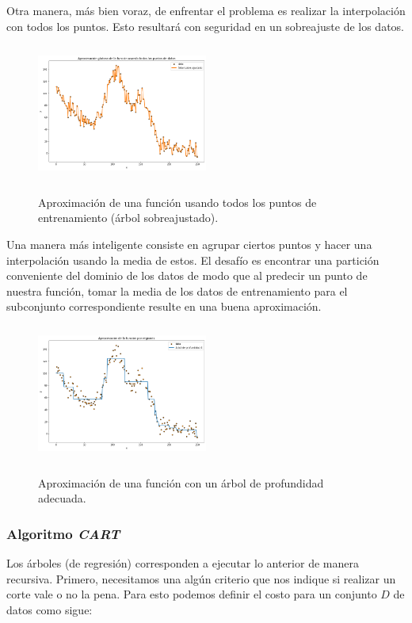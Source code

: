 Otra manera, más bien voraz, de enfrentar el problema es realizar la interpolación con todos los puntos. Esto resultará con seguridad en un sobreajuste de los datos.

\begin{figure}[h]
	\centering
	\includegraphics[width=0.5\textwidth, height=4.5cm]{img/capN_sobreajuste_arbol.png}\\
	\caption{Aproximación de una función usando todos los puntos de entrenamiento (árbol sobreajustado).}
\end{figure}

Una manera más inteligente consiste en agrupar ciertos puntos y hacer una interpolación usando la media de estos. El desafío es encontrar una partición conveniente del dominio de los datos de modo que al predecir un punto de nuestra función, tomar la media de los datos de entrenamiento para el subconjunto correspondiente resulte en una buena aproximación.

\begin{figure}[h]
	\centering
	\includegraphics[width=0.5\textwidth, height=4.5cm]{img/capN_buen_arbol.png}\\
	\caption{Aproximación de una función con un árbol de profundidad adecuada.}
\end{figure}


\subsubsection{Algoritmo \textit{CART}}

Los árboles (de regresión) corresponden a ejecutar lo anterior de manera recursiva. Primero, necesitamos una algún criterio que nos indique si realizar un corte vale o no la pena. Para esto podemos definir el costo para un conjunto $D$ de datos como sigue:

